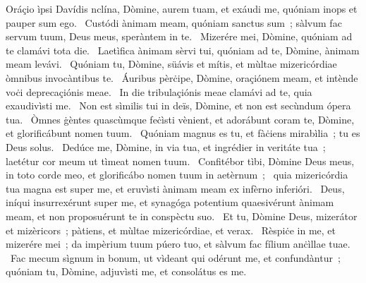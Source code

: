 { Oráçio ìpsi Davídis}
{%
nclína, Dòmine, aurem tuam, et exáudi me, quóniam inops et pauper sum ego. 
~Custódi ànimam meam, quóniam sanctus sum~; sàlvum fac servum tuum, Deus meus, speràntem in te. 
~Mizerére mei, Dòmine, quóniam ad te clamávi tota die. 
~Laetìfica ànimam sèrvi tui, quóniam ad te, Dòmine, ànimam meam levávi. 
~Quóniam tu, Dòmine, süávis et mítis, et mùltae mizericórdiae òmnibus invocàntibus te. 
~Áuribus pèrċipe, Dòmine, oraçiónem meam, et intènde voċi deprecaçiónis meae. 
~In die tribulaçiónis meae clamávi ad te, quia exaudivìsti me. 
~Non est sìmilis tui in deïs, Dòmine, et non est secùndum ópera tua. 
~Òmnes ġèntes quascùmque feċìsti vènient, et adorábunt coram te, Dòmine, et glorificábunt nomen tuum. 
~Quóniam magnus es tu, et fàċiens mirabìlia~; tu es Deus solus. 
~Dedúce me, Dòmine, in via tua, et ingrédier in veritáte tua~; laetétur cor meum ut tìmeat nomen tuum. 
~Confitébor tìbi, Dòmine Deus meus, in toto corde meo, et glorificábo nomen tuum in aetèrnum~; 
~quia mizericórdia tua magna est super me, et eruvìsti ànimam meam ex infèrno inferióri. 
~Deus, iníqui insurrexérunt super me, et synagóga potentium quaesivérunt ànimam meam, et non proposuérunt te in conspèctu suo. 
~Et tu, Dòmine Deus, mizerátor et mizèricors~; pàtiens, et mùltae mizericórdiae, et verax. 
~Rèspiċe in me, et mizerére mei~; da impèrium tuum púero tuo, et sàlvum fac fílium anċìllae tuae. 
~Fac mecum sìgnum in bonum, ut vìdeant qui odérunt me, et confundàntur~; quóniam tu, Dòmine, adjuvìsti me, et consolátus es me. 
}

